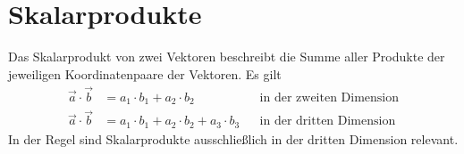 \documentclass{article}
\begin{document}
  
\newcommand{\norm}[1]{\big| {#1} \big|}  
\newcommand{\vect}[1]{\overrightarrow{#1}} 
 
\section{Skalarprodukte}
Das Skalarprodukt von zwei Vektoren beschreibt die Summe aller Produkte der jeweiligen Koordinatenpaare der Vektoren. Es gilt
\begin{align*}
 \vect{a} \cdot \vect{b} &=
 a_1 \cdot b_1 + a_2 \cdot b_2 && \text{in der zweiten Dimension} \\
 \vect{a} \cdot \vect{b} &=
 a_1 \cdot b_1 + a_2 \cdot b_2 + a_3 \cdot b_3 && \text{in der dritten Dimension}
\end{align*}
In der Regel sind Skalarprodukte ausschließlich in der dritten Dimension relevant. 
 
\end{document}
